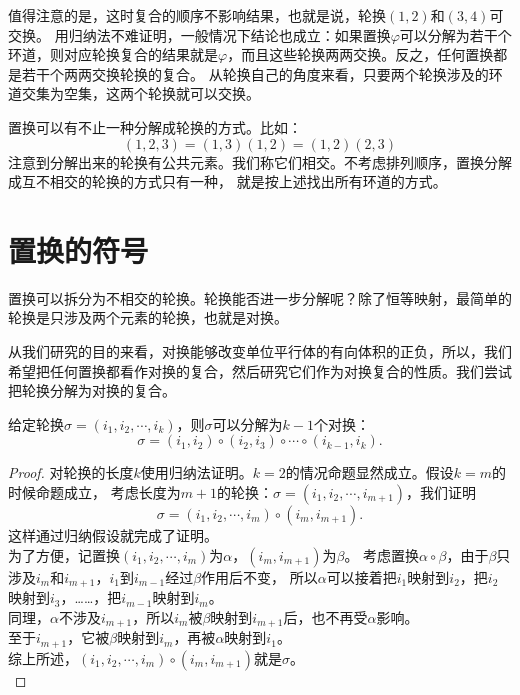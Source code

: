 \documentclass[12pt,UTF8,fontset=none]{ctexbook}
\begin{document}
值得注意的是，这时复合的顺序不影响结果，也就是说，轮换$(1, 2)$和$(3, 4)$可交换。
用归纳法不难证明，一般情况下结论也成立：如果置换$\varphi$可以分解为若干个环道，则对应轮换复合的结果就是$\varphi$，而且这些轮换两两交换。反之，任何置换都是若干个两两交换轮换的复合。
从轮换自己的角度来看，只要两个轮换涉及的环道交集为空集，这两个轮换就可以交换。

置换可以有不止一种分解成轮换的方式。比如：
$$(1,2,3) = (1,3)(1,2) = (1,2)(2,3)$$
注意到分解出来的轮换有公共元素。我们称它们相交。不考虑排列顺序，置换分解成互不相交的轮换的方式只有一种，
就是按上述找出所有环道的方式。

\section{置换的符号}
置换可以拆分为不相交的轮换。轮换能否进一步分解呢？除了恒等映射，最简单的轮换是只涉及两个元素的轮换，也就是对换。

从我们研究的目的来看，对换能够改变单位平行体的有向体积的正负，所以，我们希望把任何置换都看作对换的复合，然后研究它们作为对换复合的性质。我们尝试把轮换分解为对换的复合。
\begin{pp}\label{pp:10_5}
    给定轮换$\sigma = (i_1, i_2, \cdots, i_k)$，则$\sigma$可以分解为$k-1$个对换：
    $$ \sigma = (i_1, i_2) \circ (i_2, i_3) \circ \cdots \circ (i_{k-1}, i_k). $$
\end{pp}
\begin{proof} %
    对轮换的长度$k$使用归纳法证明。$k=2$的情况命题显然成立。假设$k=m$的时候命题成立，
    考虑长度为$m+1$的轮换：$\sigma = (i_1, i_2, \cdots, i_{m+1})$，我们证明
    $$ \sigma = (i_1, i_2, \cdots, i_m) \circ (i_m, i_{m+1}).$$
    这样通过归纳假设就完成了证明。\\
    为了方便，记置换$(i_1, i_2, \cdots, i_m)$为$\alpha$，$(i_m, i_{m+1})$为$\beta$。
    考虑置换$\alpha \circ \beta$，由于$\beta$只涉及$i_m$和$i_{m+1}$，$i_1$到$i_{m-1}$经过$\beta$作用后不变，
    所以$\alpha$可以接着把$i_1$映射到$i_2$，把$i_2$映射到$i_3$，……，把$i_{m-1}$映射到$i_{m}$。\\
    同理，$\alpha$不涉及$i_{m+1}$，所以$i_m$被$\beta$映射到$i_{m+1}$后，也不再受$\alpha$影响。\\
    至于$i_{m+1}$，它被$\beta$映射到$i_m$，再被$\alpha$映射到$i_1$。\\
    综上所述，$(i_1, i_2, \cdots, i_m) \circ (i_m, i_{m+1})$就是$\sigma$。\\
\end{proof}
\end{document}
